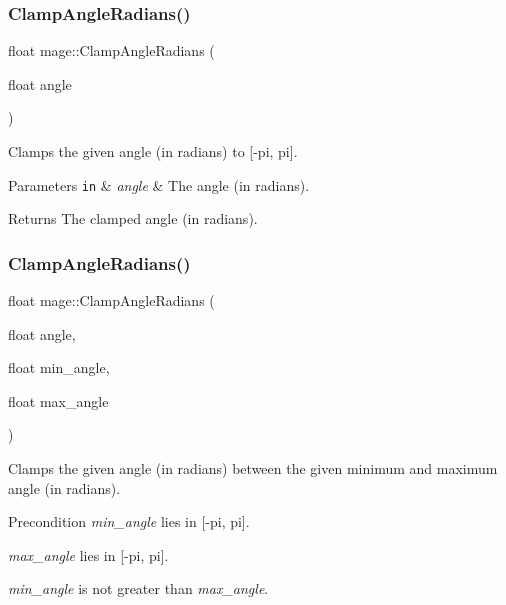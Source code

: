 \subsubsection{\texorpdfstring{Clamp\+Angle\+Radians()}{ClampAngleRadians()}\hspace{0.1cm}{\footnotesize\ttfamily [1/2]}}
{\footnotesize\ttfamily float mage\+::\+Clamp\+Angle\+Radians (\begin{DoxyParamCaption}\item[{float}]{angle }\end{DoxyParamCaption})}

Clamps the given angle (in radians) to \mbox{[}-\/pi, pi\mbox{]}.


\begin{DoxyParams}[1]{Parameters}
\mbox{\tt in}  & {\em angle} & The angle (in radians). \\
\hline
\end{DoxyParams}
\begin{DoxyReturn}{Returns}
The clamped angle (in radians). 
\end{DoxyReturn}
\hypertarget{namespacemage_a85caeb6cab349e4eff83919fbf430700}{}\label{namespacemage_a85caeb6cab349e4eff83919fbf430700} 
\subsubsection{\texorpdfstring{Clamp\+Angle\+Radians()}{ClampAngleRadians()}\hspace{0.1cm}{\footnotesize\ttfamily [2/2]}}
{\footnotesize\ttfamily float mage\+::\+Clamp\+Angle\+Radians (\begin{DoxyParamCaption}\item[{float}]{angle,  }\item[{float}]{min\+\_\+angle,  }\item[{float}]{max\+\_\+angle }\end{DoxyParamCaption})}

Clamps the given angle (in radians) between the given minimum and maximum angle (in radians).

\begin{DoxyPrecond}{Precondition}
{\itshape min\+\_\+angle} lies in \mbox{[}-\/pi, pi\mbox{]}. 

{\itshape max\+\_\+angle} lies in \mbox{[}-\/pi, pi\mbox{]}. 

{\itshape min\+\_\+angle} is not greater than {\itshape max\+\_\+angle}. 
\end{DoxyPrecond}

